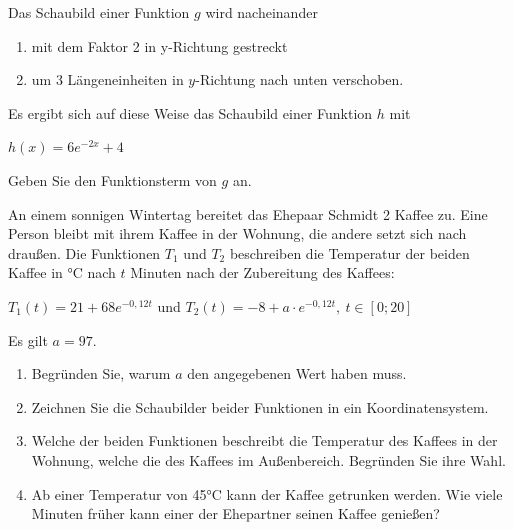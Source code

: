 \begin{Exercise}[title={Zeitansatz 8 min, ohne Taschenrechner}, label=eFktVA_14]%

Das Schaubild einer Funktion \(g\) wird nacheinander
\begin{enumerate}
    \item mit dem Faktor 2 in y-Richtung gestreckt
    \item um 3 Längeneinheiten in \(y\)-Richtung nach unten verschoben.
\end{enumerate}
Es ergibt sich auf diese Weise das Schaubild einer Funktion \(h\) mit

\(h(x)=6e^{-2x}+4\)

Geben Sie den Funktionsterm von \(g\) an.
\end{Exercise}
\begin{Exercise}[title={Zeitansatz 28 min, mit Taschenrechner}, label=eFktVA_15]%

An einem sonnigen Wintertag bereitet das Ehepaar Schmidt 2 Kaffee zu. Eine Person bleibt mit ihrem Kaffee in der Wohnung, die andere setzt sich nach draußen. Die Funktionen \(T_1\) und \(T_2\) beschreiben die Temperatur der beiden Kaffee in °C nach \(t\) Minuten nach der Zubereitung des Kaffees:

\(T_1(t)=21+68e^{-0,12t}\) und \(T_2(t)=-8+a\cdot e^{-0,12t},\ t\in[0;20]\)

Es gilt \(a=97\).
\begin{enumerate}[label=\alph*)]
    \item Begründen Sie, warum \(a\) den angegebenen Wert haben muss.
    \item Zeichnen Sie die Schaubilder beider Funktionen in ein Koordinatensystem.
    \item Welche der beiden Funktionen beschreibt die Temperatur des Kaffees in der Wohnung, welche die des Kaffees im Außenbereich. Begründen Sie ihre Wahl.
    \item Ab einer Temperatur von 45°C kann der Kaffee getrunken werden. Wie viele Minuten früher kann einer der Ehepartner seinen Kaffee genießen?
\end{enumerate}
\end{Exercise}
\newpage
